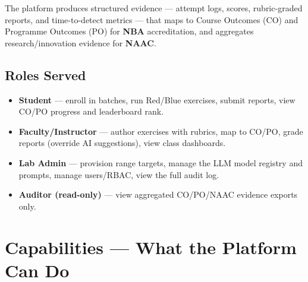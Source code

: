 \documentclass[11pt,a4paper]{article}
\begin{document}
The platform produces structured evidence --- attempt logs, scores,
rubric-graded reports, and time-to-detect metrics --- that maps to Course
Outcomes (CO) and Programme Outcomes (PO) for \textbf{NBA} accreditation, and
aggregates research/innovation evidence for \textbf{NAAC}.

\subsection{Roles Served}
\begin{itemize}[leftmargin=*]
  \item \textbf{Student} --- enroll in batches, run Red/Blue exercises, submit reports, view CO/PO progress and leaderboard rank.
  \item \textbf{Faculty/Instructor} --- author exercises with rubrics, map to CO/PO, grade reports (override AI suggestions), view class dashboards.
  \item \textbf{Lab Admin} --- provision range targets, manage the LLM model registry and prompts, manage users/RBAC, view the full audit log.
  \item \textbf{Auditor (read-only)} --- view aggregated CO/PO/NAAC evidence exports only.
\end{itemize}

\section{Capabilities --- What the Platform Can Do}
\end{document}
